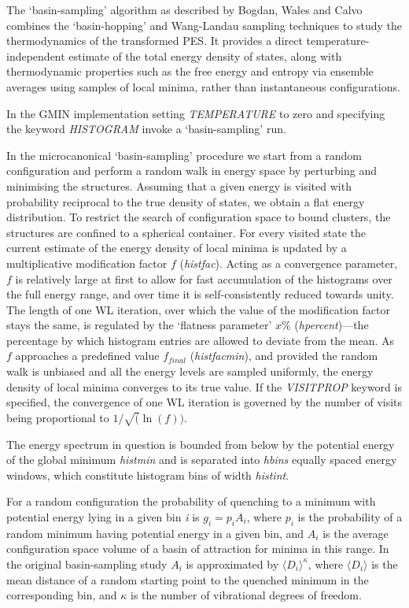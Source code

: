 \documentclass[12pt,a4paper,dvips]{article}
\begin{document}
The `basin-sampling' algorithm as described by Bogdan, Wales and Calvo \cite{BogdanWC06} 
combines the `basin-hopping' \cite{walesd97a} and Wang-Landau 
sampling techniques \cite{wangl01} to study the thermodynamics of the transformed PES.
It provides a direct temperature-independent estimate of the total energy density of states,
along with thermodynamic properties such as the free energy and entropy via ensemble averages using
samples of local minima, rather than instantaneous configurations.

In the GMIN implementation setting {\it TEMPERATURE}
to zero and specifying the keyword {\it HISTOGRAM} invoke a `basin-sampling' run. 

In the microcanonical `basin-sampling' 
procedure we start from a random configuration and perform a random walk in energy space
by perturbing and minimising the structures. Assuming that a given energy is visited with probability
reciprocal to the true density of states, 
we obtain a flat energy distribution. To restrict the search of configuration
space to  bound clusters, the structures are confined to a spherical container. 
For every visited state the current estimate of the energy density of local minima
is updated by a multiplicative modification factor $f$ ({\it histfac}). 
Acting as a convergence parameter, $f$ is relatively large at first to allow for
fast accumulation of the histograms over the full energy range, 
and over time it is self-consistently reduced towards unity.
The length of one WL iteration, over which the value of the
modification factor stays the same, is regulated by the 
`flatness parameter' $x \%$ ({\it hpercent})---the percentage by which histogram entries
are allowed to deviate from the mean. As $f$ approaches a predefined 
value $f_{final}$ ({\it histfacmin}), and provided the random walk is unbiased
and all the energy levels are sampled uniformly, the energy density of local
minima converges to its true value. If 
the {\it VISITPROP} keyword is specified, the convergence of one WL iteration is governed by
the number of visits being proportional to $1/\sqrt(\ln(f))$\cite{ZhouB03}.

The energy spectrum in question is bounded from below by the potential energy of the global 
minimum {\it histmin} and is separated into {\it hbins}  
equally spaced energy windows, which constitute histogram bins of width {\it histint}. 

For a random configuration the probability of quenching to a minimum with potential energy 
lying in a given bin {\it i}  is
$g_i=p_i A_i$, where $p_i$ is the probability of a random minimum having potential
energy in a given bin, and $A_i$ is the average configuration space volume
of a basin of attraction for minima in this range. In the original
basin-sampling study $A_i$ is approximated by 
$\langle D_i \rangle ^{\kappa} $, 
where $\langle D_i \rangle$ is  the mean distance of a random starting point to the quenched minimum in the
corresponding bin, and  $\kappa$ is the number of vibrational degrees of freedom. 
\end{document}
